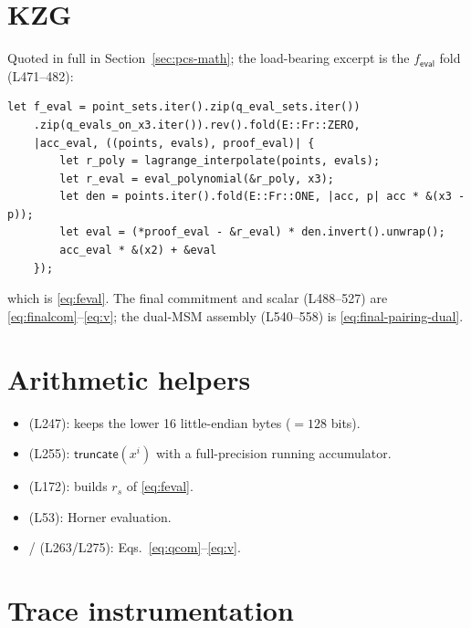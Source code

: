 \section{KZG }
\label{sec:rust-multiprep}

Quoted in full in Section~\ref{sec:pcs-math}; the load-bearing excerpt is
the $f_{\mathsf{eval}}$ fold (L471--482):
\begin{lstlisting}[style=rust]
let f_eval = point_sets.iter().zip(q_eval_sets.iter())
    .zip(q_evals_on_x3.iter()).rev().fold(E::Fr::ZERO,
    |acc_eval, ((points, evals), proof_eval)| {
        let r_poly = lagrange_interpolate(points, evals);
        let r_eval = eval_polynomial(&r_poly, x3);
        let den = points.iter().fold(E::Fr::ONE, |acc, p| acc * &(x3 - p));
        let eval = (*proof_eval - &r_eval) * den.invert().unwrap();
        acc_eval * &(x2) + &eval
    });
\end{lstlisting}
which is \eqref{eq:feval}. The final commitment and scalar (L488--527)
are \eqref{eq:finalcom}--\eqref{eq:v}; the dual-MSM assembly (L540--558)
is \eqref{eq:final-pairing-dual}.

\section{Arithmetic helpers}
\label{sec:rust-arith}

\begin{itemize}[leftmargin=1.4em,itemsep=1pt]
  \item {} (L247): keeps the lower 16 little-endian bytes
        ($=128$ bits).
  \item {} (L255): $\mathsf{truncate}(x^i)$ with a
        full-precision running accumulator.
  \item {} (L172): builds $r_s$ of
        \eqref{eq:feval}.
  \item {} (L53): Horner evaluation.
  \item {}/ (L263/L275):
        Eqs.~\eqref{eq:qcom}--\eqref{eq:v}.
\end{itemize}

\section{Trace instrumentation}
\label{sec:rust-trace}

